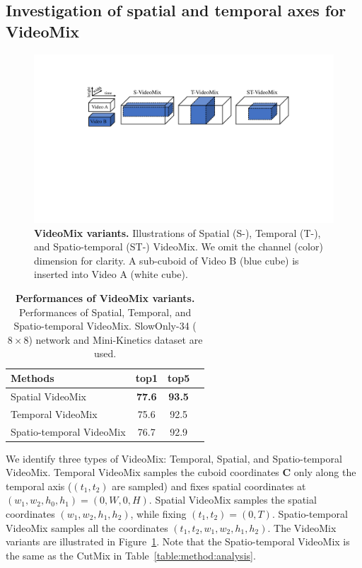 \subsection{Investigation of spatial and temporal axes for VideoMix}
\begin{figure}[!t]
\centering
\includegraphics[width=\linewidth]{arxiv_videomix/main/figures/videomix.pdf}
\caption{\textbf{VideoMix variants.} Illustrations of Spatial (S-), Temporal (T-), and Spatio-temporal (ST-) VideoMix. 
We omit the channel (color) dimension for clarity. A sub-cuboid of Video B (blue cube) is inserted into Video A (white cube).}
\label{fig:videomix:videomix_types}
\end{figure}
\begin{table}[!t]
\centering
\begin{tabular}{@{}lccc@{}}
\toprule
Methods              & top1  & top5  \\ \midrule
Spatial VideoMix       &  \textbf{77.6}    &  \textbf{93.5} \\
Temporal VideoMix       &   75.6   & 92.5 \\
Spatio-temporal VideoMix       & 76.7  & 92.9\\
\midrule
\end{tabular}
\caption{\textbf{Performances of VideoMix variants.} Performances of Spatial, Temporal, and Spatio-temporal VideoMix. SlowOnly-34 ($8\times8$) network and Mini-Kinetics dataset are used.
}
\label{table:method:videomix_types}
\end{table}

We identify three types of VideoMix: Temporal, Spatial, and Spatio-temporal VideoMix.
Temporal VideoMix samples the cuboid coordinates $\mathbf{C}$ only along the temporal axis ($(t_1,t_2)$ are sampled) and fixes spatial coordinates at $(w_1,w_2,h_0,h_1)=(0,W,0,H)$. Spatial VideoMix samples the spatial coordinates $(w_1,w_2,h_1,h_2)$, while fixing $(t_1,t_2)=(0,T)$. 
Spatio-temporal VideoMix samples all the coordinates $(t_1,t_2,w_1,w_2,h_1,h_2)$.
The VideoMix variants are illustrated in Figure~\ref{fig:videomix:videomix_types}. 
Note that the Spatio-temporal VideoMix is the same as the CutMix in Table~\ref{table:method:analysis}.

